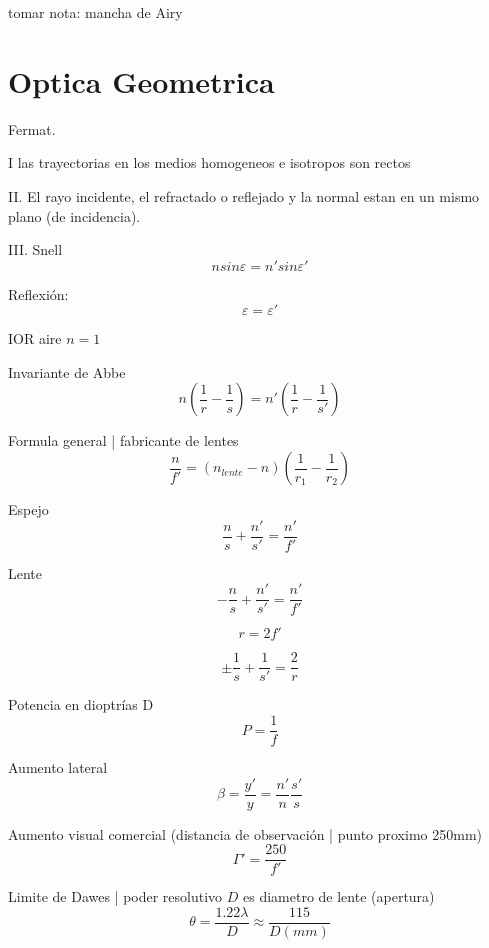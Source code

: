 \documentclass[12pt, letterpaper, twoside]{article}
\begin{document}
	tomar nota: mancha de Airy
	
	\section{Optica Geometrica}
	
	Fermat.
	
	I las trayectorias en los medios homogeneos e isotropos son rectos
	
	II. El rayo incidente, el refractado o reflejado y la normal estan en un mismo plano (de incidencia).
	
	III. Snell
	\begin{equation}
		n sin \varepsilon = n' sin \varepsilon'
	\end{equation}

	Reflexión: 
	\begin{equation}
		\varepsilon = \varepsilon'
	\end{equation}
	
	IOR aire $n = 1$

	Invariante de Abbe
	\begin{equation}
		n ( \frac{1}{r} - \frac{1}{s} ) = n' (\frac{1}{r} - \frac{1}{s'} )
	\end{equation}

	Formula general | fabricante de lentes	
	\begin{equation}
		\frac{n}{f'} = (n_{lente} - n)(\frac{1}{r_1} - \frac{1}{r_2})
	\end{equation}

	Espejo
	\begin{equation}
		\frac{n}{s} + \frac{n'}{s'} = \frac{n'}{f'}
	\end{equation}

	Lente
	\begin{equation}
		-\frac{n}{s} + \frac{n'}{s'} = \frac{n'}{f'}
	\end{equation}

	\begin{equation}
		r = 2f'
	\end{equation}

	\begin{equation}
		\pm \frac{1}{s} + \frac{1}{s'} = \frac{2}{r}
	\end{equation}
	
	Potencia en dioptrías D
	\begin{equation}
		P = \frac{1}{f}
	\end{equation}
	
	Aumento lateral
	\begin{equation}
		\beta = \frac{y'}{y} = \frac{n'}{n} \frac{s'}{s}
	\end{equation}

	Aumento visual comercial (distancia de observación | punto proximo 250mm)
	\begin{equation}
		\Gamma' = \frac{250}{f'}
	\end{equation}

	Limite de Dawes | poder resolutivo $D$ es diametro de lente (apertura)
	\begin{equation}
		\theta = \frac{1.22 \lambda}{D} \approx \frac{115}{D (mm)}
	\end{equation}
	
	
\end{document}
